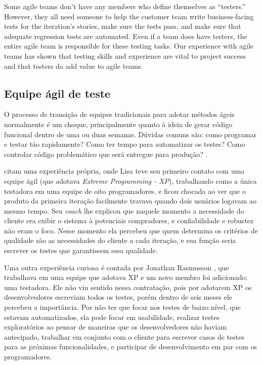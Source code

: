 \documentclass[
	12pt,				%
	openright,			%
	oneside,			%
	a4paper,			%
	english,			%
	brazil,				%
	]{abntex2}
\begin{document}
Some agile teams don’t have any members who define themselves as “testers.” However, they all need someone to help the customer team write business-facing tests for the iteration’s stories, make sure the tests pass, and make sure that adequate regression tests are automated. Even if a team does have testers, the entire agile team is responsible for these testing tasks. Our experience with agile teams has shown that testing skills and experience are vital to project success and that testers do add value to agile teams.

\subsection{Equipe ágil de teste}

O processo de transição de equipes tradicionais para adotar métodos ágeis normalmente é um choque, principalmente quanto à ideia de gerar código funcional dentro de uma ou duas semanas. Dúvidas comuns são: como programar e testar tão rapidamente? Como ter tempo para automatizar os testes? Como controlar código problemático que será entregue para produção? \cite{crispin2009}.

 citam uma experiência própria, onde Lisa teve seu primeiro contato com uma equipe ágil (que adotava \emph{Extreme Programming - XP}), trabalhando como a única testadora em uma equipe de oito programadores, e ficou chocada ao ver que o produto da primeira iteração facilmente travava quando dois usuários logavam ao mesmo tempo. Seu \emph{coach} lhe explicou que naquele momento a necessidade do cliente era exibir o sistema à potenciais compradores, e confiabilidade e robustez não eram o foco. Nesse momento ela percebeu que quem determina os critérios de qualidade são as necessidades do cliente a cada iteração, e sua função seria escrever os testes que garantissem essa qualidade.

Uma outra experiência curiosa é contada por Jonathan Rasmusson \cite{crispin2009}, que trabalhava em uma equipe que adotava XP e um novo membro foi adicionado: uma testadora. Ele não viu sentido nessa contratação, pois por adotarem XP os desenvolvedores escreviam todos os testes, porém dentro de seis meses ele percebeu a importância. Por não ter que focar nos testes de baixo nível, que estavam automatizados, ela pode focar em usabilidade, realizar testes exploratórios ao pensar de maneiras que os desenvolvedores não haviam antecipado, trabalhar em conjunto com o cliente para escrever casos de testes para as próximas funcionalidades, e participar de desenvolvimento em par com os programadores.
\end{document}
